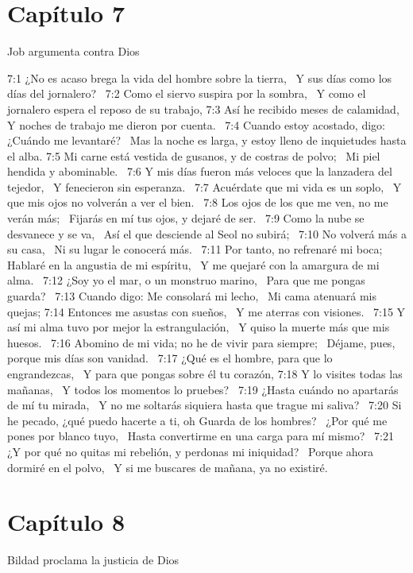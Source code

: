 \section*{Capítulo 7 }
Job argumenta contra Dios  

7:1 ¿No es acaso brega la vida del hombre sobre la tierra,  
Y sus días como los días del jornalero?  
7:2 Como el siervo suspira por la sombra,  
Y como el jornalero espera el reposo de su trabajo, 
7:3 Así he recibido meses de calamidad,  
Y noches de trabajo me dieron por cuenta.  
7:4 Cuando estoy acostado, digo: ¿Cuándo me levantaré?  
Mas la noche es larga, y estoy lleno de inquietudes hasta el alba. 
7:5 Mi carne está vestida de gusanos, y de costras de polvo;  
Mi piel hendida y abominable.  
7:6 Y mis días fueron más veloces que la lanzadera del tejedor,  
Y fenecieron sin esperanza.  
7:7 Acuérdate que mi vida es un soplo,  
Y que mis ojos no volverán a ver el bien.  
7:8 Los ojos de los que me ven, no me verán más;  
Fijarás en mí tus ojos, y dejaré de ser.  
7:9 Como la nube se desvanece y se va,  
Así el que desciende al Seol no subirá;  
7:10 No volverá más a su casa,  
Ni su lugar le conocerá más.  
7:11 Por tanto, no refrenaré mi boca;  
Hablaré en la angustia de mi espíritu,  
Y me quejaré con la amargura de mi alma.  
7:12 ¿Soy yo el mar, o un monstruo marino,  
Para que me pongas guarda?  
7:13 Cuando digo: Me consolará mi lecho,  
Mi cama atenuará mis quejas; 
7:14 Entonces me asustas con sueños,  
Y me aterras con visiones.  
7:15 Y así mi alma tuvo por mejor la estrangulación,  
Y quiso la muerte más que mis huesos.  
7:16 Abomino de mi vida; no he de vivir para siempre;  
Déjame, pues, porque mis días son vanidad.  
7:17 ¿Qué es el hombre, para que lo engrandezcas,  
Y para que pongas sobre él tu corazón, 
7:18 Y lo visites todas las mañanas,  
Y todos los momentos lo pruebes?  
7:19 ¿Hasta cuándo no apartarás de mí tu mirada,  
Y no me soltarás siquiera hasta que trague mi saliva?  
7:20 Si he pecado, ¿qué puedo hacerte a ti, oh Guarda de los hombres?  
¿Por qué me pones por blanco tuyo,  
Hasta convertirme en una carga para mí mismo?  
7:21 ¿Y por qué no quitas mi rebelión, y perdonas mi iniquidad?  
Porque ahora dormiré en el polvo,  
Y si me buscares de mañana, ya no existiré.  
\section*{Capítulo 8 }
Bildad proclama la justicia de Dios  

